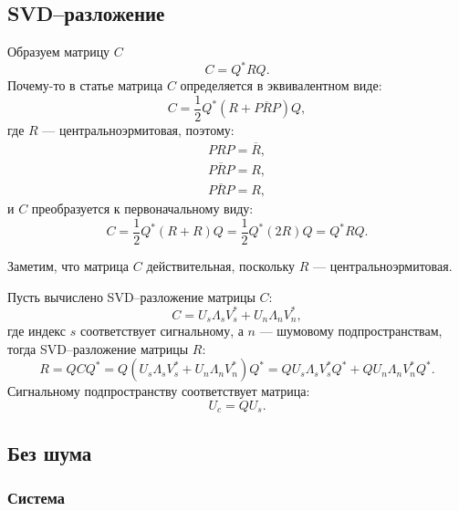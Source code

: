 \subsection{SVD--разложение}

Образуем матрицу $C$
\[
    C
    = Q^* R Q .
\]
Почему-то в статье \cite{Cao_Liu} матрица $C$ определяется в эквивалентном виде:
\[
    C
    = \frac{1}{2} Q^* \left( R + P \overline{R} P \right) Q ,
\]
где $R$ --- центральноэрмитовая, поэтому:
\begin{gather*}
    P R P = \overline{R} , \\
    \overline{P R P} = R , \\
    P \overline{R} P = R ,
\end{gather*}
и $C$ преобразуется к первоначальному виду:
\[
    C
    = \frac{1}{2} Q^* \left( R + R \right) Q
    = \frac{1}{2} Q^* \left( 2 R \right) Q
    = Q^* R Q .
\]

Заметим, что матрица $C$ действительная, поскольку $R$ --- центральноэрмитовая.

Пусть вычислено SVD--разложение матрицы $C$:
\[
    C = U_s \Lambda_s V_s^* + U_n \Lambda_n V_n^* ,
\]
где индекс $s$ соответствует сигнальному, а $n$ --- шумовому подпространствам, тогда SVD--разложение матрицы $R$:
\[
    R
    = Q C Q^*
    = Q \left( U_s \Lambda_s V_s^* + U_n \Lambda_n V_n^* \right) Q^*
    = Q U_s \Lambda_s V_s^* Q^* + Q U_n \Lambda_n V_n^* Q^* .
\]
Сигнальному подпространству соответствует матрица:
\[
    U_c = Q U_s .
\]

\subsection{Без шума}

\subsubsection{Система}

